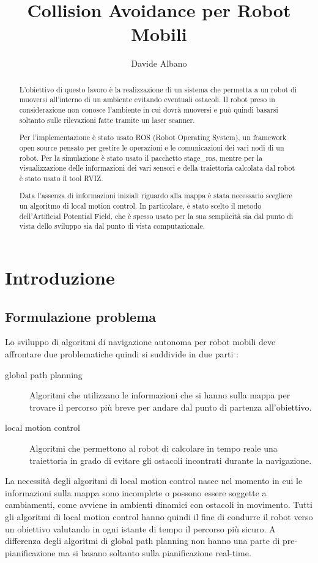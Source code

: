 \documentclass[Lau, binding=0.6cm, oneside]{sapthesis}
\title{Collision Avoidance per Robot Mobili}
\author{Davide Albano}
\begin{document}
\maketitle
\begin{abstract}
L'obiettivo di questo lavoro è la realizzazione di un sistema che permetta a un robot di muoversi all'interno di un ambiente evitando eventuali ostacoli.
Il robot preso in considerazione non conosce l'ambiente in cui dovrà muoversi e può quindi basarsi soltanto sulle rilevazioni fatte tramite un laser scanner.

Per l'implementazione è stato usato ROS (Robot Operating System), un framework open source pensato per gestire le operazioni e le comunicazioni dei vari nodi di un robot.
Per la simulazione è stato usato il pacchetto stage\_ros, mentre per la visualizzazione delle informazioni dei vari sensori e della traiettoria calcolata dal robot è stato usato il tool RVIZ.

Data l'assenza di informazioni iniziali riguardo alla mappa è stata necessario scegliere un algoritmo di local motion control.
In particolare, è stato scelto il metodo dell'Artificial Potential Field, che è spesso usato per la sua semplicità sia dal punto di vista dello sviluppo sia dal punto di vista computazionale.
\end{abstract}
\tableofcontents

\chapter{Introduzione}
\section{Formulazione problema}
Lo sviluppo di algoritmi di navigazione autonoma per robot mobili deve affrontare due problematiche quindi si suddivide in due parti \cite{fonte1}:
\begin{description}
	\item[global path planning] Algoritmi che utilizzano le informazioni che si hanno sulla mappa per trovare il percorso più breve per andare dal punto di partenza all'obiettivo.
	\item[local motion control] Algoritmi che permettono al robot di calcolare in tempo reale una traiettoria in grado di evitare gli ostacoli incontrati durante la navigazione.
\end{description}

La necessità degli algoritmi di local motion control nasce nel momento in cui le informazioni sulla mappa sono incomplete o possono essere soggette a cambiamenti, come avviene in ambienti dinamici con ostacoli in movimento.
Tutti gli algoritmi di local motion control hanno quindi il fine di condurre il robot verso un obiettivo valutando in ogni istante di tempo il percorso più sicuro.
A differenza degli algoritmi di global path planning non hanno una parte di pre-pianificazione ma si basano soltanto sulla pianificazione real-time.
\end{document}
